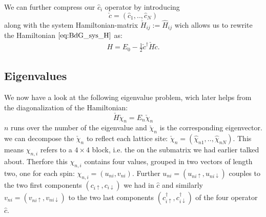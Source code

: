 \documentclass[../main.tex]{subfile}
\begin{document}
We can further compress our $\hat{c}_i$ operator by introducing 
\[
    \check{c} = (\hat{c}_1,..,\hat{c}_N)
\] 
along with the system Hamiltonian-matrix $\check{H}_{ij} := \hat{H}_{ij}$ wich allows us to rewrite the Hamiltonian $\ref{eq:BdG_sys_H}$ as:
\begin{align}
    H = E_0 - \frac{1}{2} \check{c}^\dagger \check{H} \check{c}.
\end{align}
\subsection{Eigenvalues}
We now have a look at the following eigenvalue problem, wich later helps from the diagonalization of the Hamiltonian:
\begin{equation}
    \label{eq:BdG_eigenVal_H} 
    \check{H} \check{\chi}_n = E_n \check{\chi}_n
\end{equation}
$n$ runs over the number of the eigenvalue and $\check{\chi}_n$ is the corresponding eigenvector.
we can decompose the $\check{\chi}_n$ to reflect each lattice site: $\check{\chi}_n = (\hat{\chi}_{n1},..,\hat{\chi}_{nN})$. 
This means $\chi_{n,i}$ refers to a $4\times4$ block, i.e. the on the submatrix we had earlier talked about.
Therfore this $\chi_{n,i}$ contains four values, grouped in two vectors of length two, one for each spin: $\chi_{n,i} = (u_{ni}, v_{ni})$.
Further $u_{ni} = (u_{ni\uparrow}, u_{ni\downarrow})$ couples to the two first components $(c_{i\uparrow},c_{i\downarrow})$ we had in $\hat{c}$ and 
similarly $v_{ni} = (v_{ni\uparrow}, v_{ni\downarrow})$ to the two last components $(c_{i\uparrow}^{\dagger},c_{i\downarrow}^{\dagger})$ of
the four operator $\hat{c}$.\\ 
\end{document}
